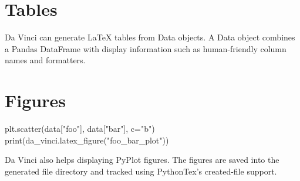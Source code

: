 \documentclass{article}
\begin{document}
\section{Tables}
Da Vinci can generate \LaTeX{} tables from Data objects. A Data object combines a Pandas DataFrame with display information such as human-friendly
column names and formatters.


\section{Figures}

\begin{pycode}
plt.scatter(data["foo"], data["bar"], c="b")
print(da_vinci.latex_figure("foo_bar_plot"))
\end{pycode}

Da Vinci also helps displaying PyPlot figures. The figures are saved into the generated file directory and tracked using PythonTex's created-file support.



\end{document}
